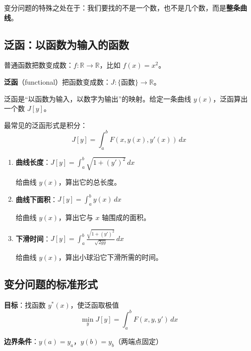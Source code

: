 变分问题的特殊之处在于：我们要找的不是一个数，也不是几个数，而是\textbf{整条曲线}。

\subsection{泛函：以函数为输入的函数}

普通函数把数变成数：$f: \mathbb{R} \to \mathbb{R}$，比如 $f(x) = x^2$。

\textbf{泛函}（functional）把函数变成数：$J: \{\text{函数}\} \to \mathbb{R}$。

\begin{definition}[泛函]
泛函是“以函数为输入，以数字为输出”的映射。给定一条曲线 $y(x)$，泛函算出一个数 $J[y]$。
\end{definition}

最常见的泛函形式是积分：
\begin{equation}
J[y] = \int_a^b F(x, y(x), y'(x)) \, dx
\end{equation}

\begin{example}[常见泛函]
\begin{enumerate}
    \item \textbf{曲线长度}：$J[y] = \int_a^b \sqrt{1 + (y')^2} \, dx$
    
    给曲线 $y(x)$，算出它的总长度。
    
    \item \textbf{曲线下面积}：$J[y] = \int_a^b y(x) \, dx$
    
    给曲线 $y(x)$，算出它与 $x$ 轴围成的面积。
    
    \item \textbf{下滑时间}：$J[y] = \int_a^b \frac{\sqrt{1 + (y')^2}}{\sqrt{2gy}} \, dx$
    
    给曲线 $y(x)$，算出小球沿它下滑所需的时间。
\end{enumerate}
\end{example}

\subsection{变分问题的标准形式}

\begin{keyformula}[title=变分问题]
\textbf{目标}：找函数 $y^*(x)$，使泛函取极值
\[
\min_{y} J[y] = \int_a^b F(x, y, y') \, dx
\]

\textbf{边界条件}：$y(a) = y_a$，$y(b) = y_b$（两端点固定）
\end{keyformula}

